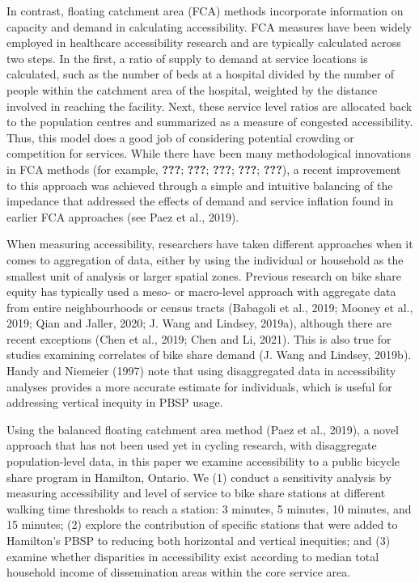 \documentclass[]{elsarticle} %
\begin{document}
In contrast, floating catchment area (FCA) methods incorporate
information on capacity and demand in calculating accessibility. FCA
measures have been widely employed in healthcare accessibility research
and are typically calculated across two steps. In the first, a ratio of
supply to demand at service locations is calculated, such as the number
of beds at a hospital divided by the number of people within the
catchment area of the hospital, weighted by the distance involved in
reaching the facility. Next, these service level ratios are allocated
back to the population centres and summarized as a measure of congested
accessibility. Thus, this model does a good job of considering potential
crowding or competition for services. While there have been many
methodological innovations in FCA methods (for example, {\textbf{???}};
{\textbf{???}}; {\textbf{???}}; {\textbf{???}}; {\textbf{???}}), a
recent improvement to this approach was achieved through a simple and
intuitive balancing of the impedance that addressed the effects of
demand and service inflation found in earlier FCA approaches (see Paez
et al., 2019).

When measuring accessibility, researchers have taken different
approaches when it comes to aggregation of data, either by using the
individual or household as the smallest unit of analysis or larger
spatial zones. Previous research on bike share equity has typically used
a meso- or macro-level approach with aggregate data from entire
neighbourhoods or census tracts (Babagoli et al., 2019; Mooney et al.,
2019; Qian and Jaller, 2020; J. Wang and Lindsey, 2019a), although there
are recent exceptions (Chen et al., 2019; Chen and Li, 2021). This is
also true for studies examining correlates of bike share demand (J. Wang
and Lindsey, 2019b). Handy and Niemeier (1997) note that using
disaggregated data in accessibility analyses provides a more accurate
estimate for individuals, which is useful for addressing vertical
inequity in PBSP usage.

Using the balanced floating catchment area method (Paez et al., 2019), a
novel approach that has not been used yet in cycling research, with
disaggregate population-level data, in this paper we examine
accessibility to a public bicycle share program in Hamilton, Ontario. We
(1) conduct a sensitivity analysis by measuring accessibility and level
of service to bike share stations at different walking time thresholds
to reach a station: 3 minutes, 5 minutes, 10 minutes, and 15 minutes;
(2) explore the contribution of specific stations that were added to
Hamilton's PBSP to reducing both horizontal and vertical inequities; and
(3) examine whether disparities in accessibility exist according to
median total household income of dissemination areas within the core
service area.
\end{document}
